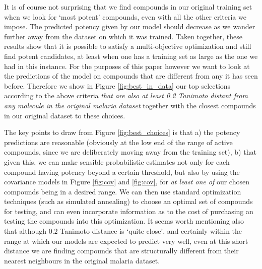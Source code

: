 \documentclass{article}
\begin{document}
It is of course not surprising that we find compounds in our original training set when we look for `most potent' compounds, even with all the other criteria we impose.  The predicted potency given by our model should decrease as we wander further away from the dataset on which it was trained.  Taken together,  these results show that it is possible to satisfy a multi-objective optimization and still find  potent candidates, at least when one has a training set as large as the one we had in this instance.
\newline
\newline
For the purposes of this paper however we want to look at the predictions of the model on compounds that are different from any it has seen before.  Therefore we show in Figure \ref{fig:best_in_data} our top selections according to the above criteria \textit{that are also at least 0.2 Tanimoto distant from any molecule in the original malaria dataset} together with the closest compounds in our original dataset to these choices.



The key points to draw from Figure \ref{fig:best_choices} is that a) the potency predictions are reasonable (obviously at the low end of the range of active compounds, since we are deliberately moving away from the training set), b) that given this, we can make sensible probabilistic estimates not only for each compound having potency beyond a certain threshold, but also by using the covariance models in Figure \ref{fig:cov} and \ref{fig:cov}, for \textit{at least one of} our chosen compounds being in a desired range.   We can then use standard optimization techniques (such as simulated annealing) to choose an optimal set of compounds for testing, and can even incorporate information as to the cost of purchasing an testing the compounds into this optimization.  It seems worth mentioning also that although $0.2$ Tanimoto distance is `quite close', and certainly within the range at which our models are expected to predict very well, even at this short distance we are finding compounds that are structurally different from their nearest neighbours in the original malaria dataset.  


\end{document}
